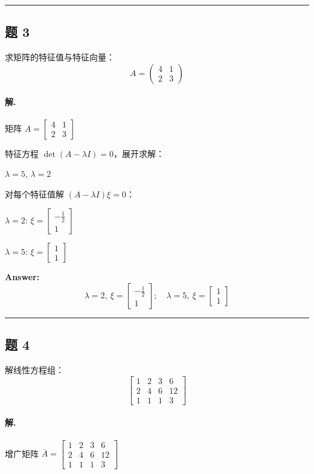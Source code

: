 \documentclass[12pt, a4paper]{article}
\newcommand{\problem}[1]{\subsection*{题 #1}}
\newcommand{\solution}{\paragraph{解.}}
\begin{document}
\vspace{1em}
\hrule
\vspace{1em}

\problem{3}

求矩阵的特征值与特征向量：
$$A = \begin{pmatrix} 4 & 1 \\ 2 & 3 \end{pmatrix}$$

\solution

矩阵 $A = \left[\begin{matrix}4 & 1\\2 & 3\end{matrix}\right]$

特征方程 $\det(A - \lambda I) = 0$，展开求解：

$\lambda = 5$, $\lambda = 2$

对每个特征值解 $(A - \lambda I)\xi = 0$：

$\lambda = 2$: $\xi = \left[\begin{matrix}- \frac{1}{2}\\1\end{matrix}\right]$

$\lambda = 5$: $\xi = \left[\begin{matrix}1\\1\end{matrix}\right]$

\textbf{Answer:}
\[\boxed{\lambda = 2,\ \xi = \left[\begin{matrix}- \frac{1}{2}\\1\end{matrix}\right]; \quad \lambda = 5,\ \xi = \left[\begin{matrix}1\\1\end{matrix}\right]}\]

\vspace{1em}
\hrule
\vspace{1em}

\problem{4}

解线性方程组：
$$\left[\begin{array}{ccc|c} 1 & 2 & 3 & 6 \\ 2 & 4 & 6 & 12 \\ 1 & 1 & 1 & 3 \end{array}\right]$$

\solution

增广矩阵 $\overline{A} = \left[\begin{matrix}1 & 2 & 3 & 6\\2 & 4 & 6 & 12\\1 & 1 & 1 & 3\end{matrix}\right]$
\end{document}
